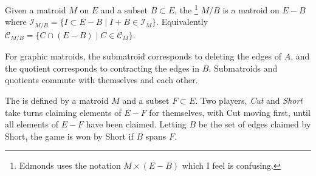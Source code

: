 \documentclass{article}
\newcommand*{\I}[0]{\mathcal{I}}
\newcommand*{\Cc}[0]{\mathcal{C}}
\begin{document}
\begin{definition}
  Given a matroid $M$ on $E$ and a subset $B \subset E$, the \footnote{Edmonds uses the notation $M \times (E - B)$ which I feel is confusing.} $M/B$ is a matroid on $E - B$ where $\I_{M/B} = \{I \subset E - B \mid I + B \in \I_M\}$.  Equivalently $\Cc_{M/B} = \{C \cap (E - B) \mid C \in \Cc_M\}$.
\end{definition}

For graphic matroids, the submatroid corresponds to deleting the edges of $A$, and the quotient corresponds to contracting the edges in $B$.  Submatroids and quotients commute with themselves and each other.

\begin{definition}
  The  is defined by a matroid $M$ and a subset $F \subset E$.
  Two players, \emph{Cut} and \emph{Short} take turns claiming elements of $E - F$ for themselves, with Cut moving first, until all elements of $E - F$ have been claimed.
  Letting $B$ be the set of edges claimed by Short,
  the game is won by Short if $B$ spans $F$.
\end{definition}
\end{document}
